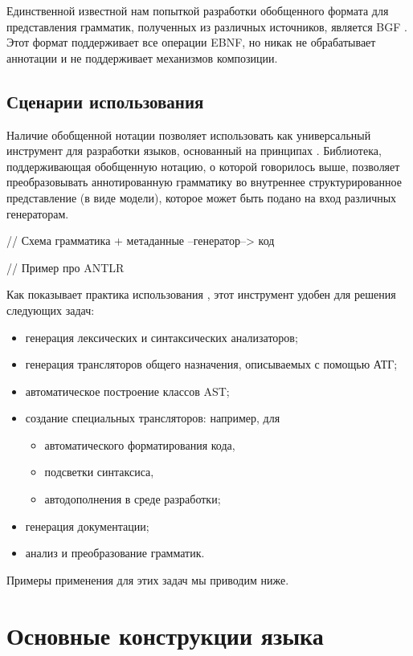 Единственной известной нам попыткой разработки обобщенного формата для представления грамматик, полученных из различных источников, является BGF \cite{ZaitsevLaemmel}. Этот формат поддерживает все операции EBNF, но никак не обрабатывает аннотации и не поддерживает механизмов композиции.

\section{Сценарии использования }

Наличие обобщенной нотации позволяет использовать  как универсальный инструмент для разработки языков, основанный на принципах  \cite{???}. Библиотека, поддерживающая обобщенную нотацию, о которой говорилось выше, позволяет преобразовывать аннотированную грамматику во внутреннее структурированное представление (в виде модели), которое может быть подано на вход различных генераторам. 

// Схема грамматика + метаданные --генератор--> код

// Пример про ANTLR

Как показывает практика использования , этот инструмент удобен для решения следующих задач:
\begin{itemize}
\item генерация лексических и синтаксических анализаторов;
\item генерация трансляторов общего назначения, описываемых с помощью АТГ;
\item автоматическое построение классов AST;
\item создание специальных трансляторов: например, для
	\begin{itemize}
		\item автоматического форматирования кода,
		\item подсветки синтаксиса,
		\item автодополнения в среде разработки;
	\end{itemize}
\item генерация документации;
\item анализ и преобразование грамматик.
\end{itemize}

Примеры применения  для этих задач мы приводим ниже.

\chapter{Основные конструкции языка}

